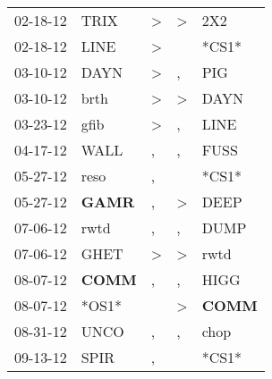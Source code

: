 \begin{supertabular}{p{0.07\textwidth}p{0.06\textwidth}p{0.02\textwidth}p{0.02\textwidth}p{0.06\textwidth}}
          02-18-12\textsuperscript{} &           TRIX\textsuperscript{} &     \textgreater &     \textgreater &            2X2\textsuperscript{} \\
          02-18-12\textsuperscript{} &           LINE\textsuperscript{} &     \textgreater &                  &                            *CS1* \\
          03-10-12\textsuperscript{} &           DAYN\textsuperscript{} &     \textgreater &                , &            PIG\textsuperscript{} \\
          03-10-12\textsuperscript{} &           brth\textsuperscript{} &     \textgreater &     \textgreater &           DAYN\textsuperscript{} \\
          03-23-12\textsuperscript{} &           gfib\textsuperscript{} &     \textgreater &                , &           LINE\textsuperscript{} \\
          04-17-12\textsuperscript{} &           WALL\textsuperscript{} &                , &                , &           FUSS\textsuperscript{} \\
          05-27-12\textsuperscript{} &           reso\textsuperscript{} &                , &                  &                            *CS1* \\
          05-27-12\textsuperscript{} &  \textbf{GAMR\textsuperscript{}} &                , &     \textgreater &           DEEP\textsuperscript{} \\
          07-06-12\textsuperscript{} &           rwtd\textsuperscript{} &                , &                , &           DUMP\textsuperscript{} \\
          07-06-12\textsuperscript{} &           GHET\textsuperscript{} &     \textgreater &     \textgreater &           rwtd\textsuperscript{} \\
          08-07-12\textsuperscript{} &  \textbf{COMM\textsuperscript{}} &                , &                , &           HIGG\textsuperscript{} \\
          08-07-12\textsuperscript{} &                            *OS1* &                  &     \textgreater &  \textbf{COMM\textsuperscript{}} \\
          08-31-12\textsuperscript{} &           UNCO\textsuperscript{} &                , &                , &           chop\textsuperscript{} \\
          09-13-12\textsuperscript{} &           SPIR\textsuperscript{} &                , &                  &                            *CS1* \\

\end{supertabular}
